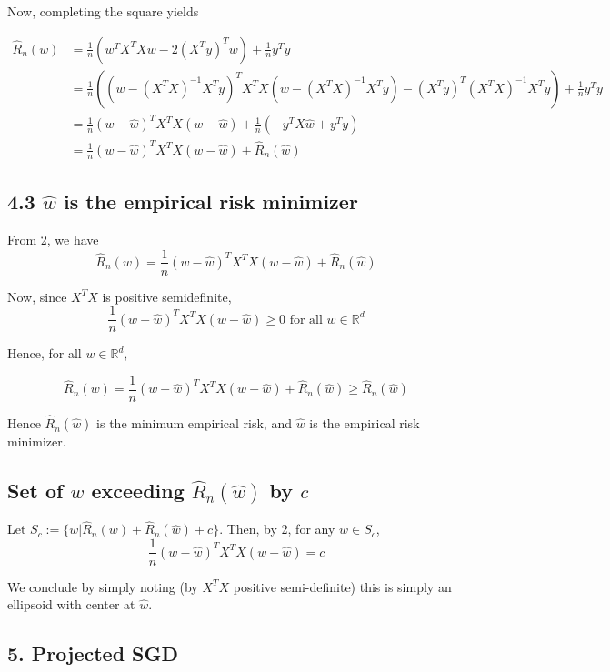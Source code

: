 \documentclass[paper=a4, fontsize=11pt]{scrartcl} %
\numberwithin{equation}{section} %
\numberwithin{figure}{section} %
\numberwithin{table}{section} %
\begin{document}
Now, completing the square yields

\begin{align*}
\hat{R}_n(w) &= \frac{1}{n}(w^TX^TXw -2(X^Ty)^Tw) + \frac{1}{n}y^Ty \\
	&= \frac{1}{n}\left( (w-(X^TX)^{-1}X^Ty)^T X^TX (w-(X^TX)^{-1}X^Ty) - (X^Ty)^T(X^TX)^{-1}X^Ty \right) + \frac{1}{n}y^Ty \\
	&= \frac{1}{n}(w-\hat{w})^T X^TX (w-\hat{w}) + \frac{1}{n} (-y^TX\hat{w} + y^Ty) \\
	&= \frac{1}{n}(w-\hat{w})^T X^TX (w-\hat{w}) + \hat{R}_n(\hat{w}) 
\end{align*}

\subsection{4.3 $\hat{w}$ is the empirical risk minimizer}

From 2, we have 
\[ \hat{R}_n(w) = \frac{1}{n}(w-\hat{w})^T X^TX (w-\hat{w}) + \hat{R}_n(\hat{w}) \]

Now, since $X^TX$ is positive semidefinite, 
\[\frac{1}{n}(w-\hat{w})^T X^TX (w-\hat{w}) \geq 0 \textrm{ for all } w \in \mathbb{R}^d\]

Hence, for all $w \in \mathbb{R}^d$,

\[\hat{R}_n(w) = \frac{1}{n}(w-\hat{w})^T X^TX (w-\hat{w}) + \hat{R}_n(\hat{w}) \geq \hat{R}_n(\hat{w})\]

Hence $\hat{R}_n(\hat{w})$ is the minimum empirical risk, and $\hat{w}$ is the empirical risk minimizer.

\subsection{Set of $w$ exceeding $\hat{R}_n(\hat{w})$ by $c$}

Let $S_c := \{w | \hat{R}_n(w) + \hat{R}_n(\hat{w}) + c\}$. Then, by 2, for any $w \in S_c$,
\[\frac{1}{n}(w-\hat{w})^T X^TX (w-\hat{w}) = c\]

We conclude by simply noting (by $X^TX$ positive semi-definite) this is simply an ellipsoid with center at $\hat{w}$.


\subsection*{5. Projected SGD}
\end{document}
